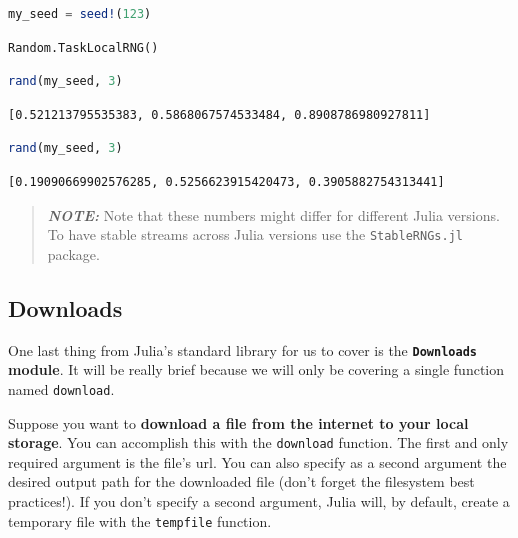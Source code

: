 \documentclass[
  notoc %
]{tufte-book}
\newcommand{\passthrough}[1]{#1}
\begin{document}
\begin{lstlisting}[language=Julia]
my_seed = seed!(123)
\end{lstlisting}

\begin{lstlisting}[language=Output]
Random.TaskLocalRNG()
\end{lstlisting}

\begin{lstlisting}[language=Julia]
rand(my_seed, 3)
\end{lstlisting}

\begin{lstlisting}[language=Output]
[0.521213795535383, 0.5868067574533484, 0.8908786980927811]
\end{lstlisting}

\begin{lstlisting}[language=Julia]
rand(my_seed, 3)
\end{lstlisting}

\begin{lstlisting}[language=Output]
[0.19090669902576285, 0.5256623915420473, 0.3905882754313441]
\end{lstlisting}

\begin{quote}
\textbf{\emph{NOTE:}} Note that these numbers might differ for different
Julia versions. To have stable streams across Julia versions use the
\passthrough{\lstinline!StableRNGs.jl!} package.
\end{quote}

\hypertarget{sec:downloads}{%
\subsection{Downloads}\label{sec:downloads}}

One last thing from Julia's standard library for us to cover is the
\textbf{\passthrough{\lstinline!Downloads!} module}. It will be really
brief because we will only be covering a single function named
\passthrough{\lstinline!download!}.

Suppose you want to \textbf{download a file from the internet to your
local storage}. You can accomplish this with the
\passthrough{\lstinline!download!} function. The first and only required
argument is the file's url. You can also specify as a second argument
the desired output path for the downloaded file (don't forget the
filesystem best practices!). If you don't specify a second argument,
Julia will, by default, create a temporary file with the
\passthrough{\lstinline!tempfile!} function.
\end{document}
